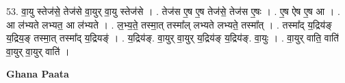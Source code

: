 \documentclass[17pt]{extarticle}
\begin{document}
53. वा॒यु स्तेज॑से॒ तेज॑से वा॒युर् वा॒यु स्तेज॑से । . तेज॑स ए॒ष ए॒ष तेज॑से॒ तेज॑स ए॒षः । . ए॒ष ऐष ए॒ष आ । . आ ल॑भ्यते लभ्यत॒ आ ल॑भ्यते । . ल॒भ्य॒ते॒ तस्मा॒त् तस्मा᳚ल् लभ्यते लभ्यते॒ तस्मा᳚त् । . तस्मा᳚द् य॒द्रिय॑ङ् य॒द्रिय॒ङ् तस्मा॒त् तस्मा᳚द् य॒द्रियङ्॑ । . य॒द्रिय॑ङ्. वा॒युर् वा॒युर् य॒द्रिय॑ङ् य॒द्रिय॑ङ्. वा॒युः । . वा॒युर् वाति॒ वाति॑ वा॒युर् वा॒युर् वाति॑ । \newline

\textbf{Ghana Paata } \newline
\end{document}

